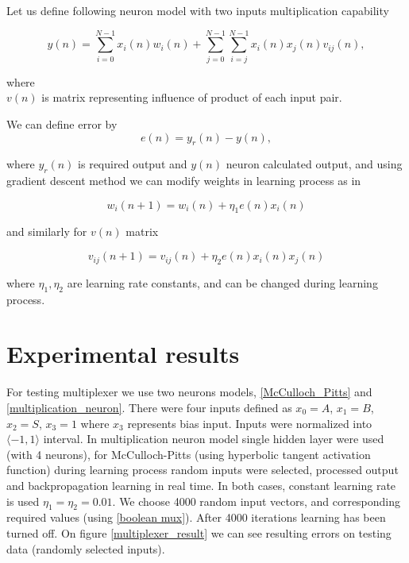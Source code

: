 \documentclass[10pt,a5paper]{article}
\begin{document}
Let us define following neuron model with two inputs multiplication capability

\begin{equation}
\label{multiplication_neuron}
  y(n) = \sum_{i = 0}^{N-1} x_i(n)w_i(n) + \sum_{j = 0}^{N-1}\sum_{i = j}^{N-1} x_i(n)x_j(n)v_{ij}(n),
\end{equation}

where \\
$v(n)$ is matrix representing influence of product of each input pair.

We can define error by
\begin{equation}
e(n) = y_r(n) - y(n),
\end{equation}

where $y_r(n)$ is required output and $y(n)$ neuron calculated output,
  and using gradient descent method we can modify weights
  in learning process as in ~\cite{bib:Backpropagation}

\begin{equation}
w_i(n+1) = w_i(n) + \eta _1 e(n)x_i(n)
\end{equation}

and similarly for $v(n)$ matrix

\begin{equation}
v_{ij}(n+1) = v_{ij}(n) + \eta _2 e(n)x_i(n)x_j(n)
\end{equation}

where $\eta _1, \eta _2$ are learning rate constants, and can be changed during learning process.

\section{Experimental results}

For testing multiplexer we use two neurons models, \ref{McCulloch_Pitts} and \ref{multiplication_neuron}.
 There were four inputs defined as $x_0 = A$, $x_1 = B$, $x_2 = S$, $x_3 = 1$ where $x_3$ represents bias input.
 Inputs were normalized into $\langle -1, 1 \rangle$ interval.
In multiplication neuron model single hidden layer were used (with 4 neurons), for McCulloch-Pitts
(using hyperbolic tangent activation function) during learning process random inputs were selected,
 processed output and backpropagation learning in real time. In both cases, constant learning rate is used $\eta _1 = \eta _2 = 0.01$.
We choose 4000 random input vectors, and corresponding required values (using \ref{boolean mux}).
 After 4000 iterations learning has been turned off.
 On figure \ref{multiplexer_result} we can see resulting errors
 on testing data (randomly selected inputs).
\end{document}
